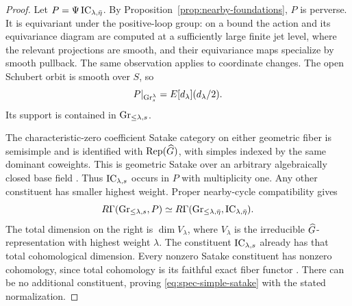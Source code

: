 \begin{proof}
Let $P=\Psi\operatorname{IC}_{\lambda,\bar\eta}$.  By
Proposition~\ref{prop:nearby-foundations}, $P$ is perverse.  It is
equivariant under the positive-loop group: on a bound the action and its
equivariance diagram are computed at a sufficiently large finite jet
level, where the relevant projections are smooth, and their equivariance
maps specialize by smooth pullback.  The same observation applies to
coordinate changes.  The open Schubert orbit is smooth over $S$, so
\[
               P|_{\operatorname{Gr}_s^\lambda}=E[d_\lambda](d_\lambda/2).
\]
Its support is contained in $\operatorname{Gr}_{\leq\lambda,s}$.

The characteristic-zero coefficient Satake category on either geometric
fiber is semisimple and is identified with $\operatorname{Rep}(\widehat G)$, with simples
indexed by the same dominant coweights.  This is geometric Satake over
an arbitrary algebraically closed base field
\cite[Theorem~14.1]{MV}.  Thus $\operatorname{IC}_{\lambda,s}$ occurs in $P$ with
multiplicity one.  Any other constituent has smaller highest weight.
Proper nearby-cycle compatibility gives
\begin{equation}\label{eq:spec-satake-cohomology}
 R\Gamma(\operatorname{Gr}_{\leq\lambda,s},P)
       \simeq
 R\Gamma(\operatorname{Gr}_{\leq\lambda,\bar\eta},
                                      \operatorname{IC}_{\lambda,\bar\eta}).
\end{equation}
The total dimension on the right is $\dim V_\lambda$, where
$V_\lambda$ is the irreducible $\widehat G$-representation with highest weight
$\lambda$.  The constituent $\operatorname{IC}_{\lambda,s}$ already has that total
cohomological dimension.  Every nonzero Satake constituent has nonzero
cohomology, since total cohomology is its faithful exact fiber functor
\cite[\S6]{MV}.  There can be no additional constituent, proving
\eqref{eq:spec-simple-satake} with the stated normalization.


\end{proof}
